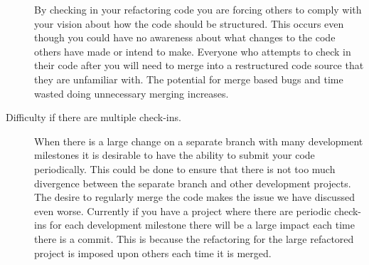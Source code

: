 \begin{description}
    By checking in your refactoring code you are forcing others to comply with your vision about how the code should be structured.  This occurs even though you could have no awareness about what changes to the code others have made or intend to make.  Everyone who attempts to check in their code after you will need to merge into a restructured code source that they are unfamiliar with.  The potential for merge based bugs and time wasted doing unnecessary merging increases.







  \item [Difficulty if there are multiple check-ins.] 
    When there is a large change on a separate branch with many development milestones it is desirable to have the ability to submit your code periodically.  This could be done to ensure that there is not too much divergence between the separate branch and other development projects. The desire to regularly merge the code makes the issue we have discussed even worse. Currently if you have a project where there are periodic check-ins for each development milestone there will be a large impact each time there is a commit. This is because the refactoring for the large refactored project is imposed upon others each time it is merged.


\end{description}
